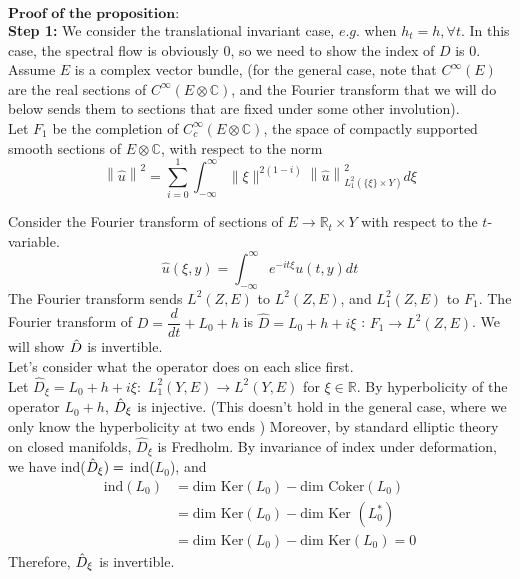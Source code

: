 		\vspace{5mm}
		$\textbf{Proof of the proposition:}$ \\
		\vspace{5mm}
		\textbf{Step 1:} We consider the translational invariant case, $e.g.$ when $h_t=h, \forall t$. In this case, the spectral flow is obviously 0, so we need to show the index of $D$ is 0. Assume $E$ is a complex vector bundle, (for the general case, note that $C^{\infty}(E)$ are the real sections of $C^{\infty}(E\otimes\mathbb{C})$, and the Fourier transform that we will do below sends them to sections that are fixed under some other involution). \\
		\vspace{2mm}
		Let $F_1$ be the completion of $C_c^{\infty}(E\otimes\mathbb{C})$, the space of compactly supported smooth sections of $E\otimes\mathbb{C}$, with respect to the norm \[ \left\lVert \hat{u}\right\rVert^2 = \sum^1_{i=0} \int^{\infty}_{-\infty} \|\xi\|^{2(1-i)} \left\lVert \hat{u}\right\rVert^2_{L^2_1(\{\xi\}\times Y)} d\xi  \]
		
		Consider the Fourier transform of sections of $E\rightarrow \mathbb{R}_t\times Y$ with respect to the $t$-variable. \[\hat{u}(\xi,y) =  \int^{\infty}_{-\infty} e^{-it\xi} u(t,y)dt \]
		The Fourier transform sends $L^2(Z,E) $ to $L^2(Z,E)$, and $L^2_1(Z,E)$ to $F_1$. The Fourier transform of $D= \dfrac{d}{dt} + L_0 + h$ is $\hat{D} = L_0 + h + i\xi$ :    $F_1 \rightarrow L^2(Z,E)$.  We will show $\Hat{D}$ is invertible. \\
		\vspace{5mm} Let's consider what the operator does on each slice first. \\
		Let $\hat{D}_{\xi} = L_0 + h +i\xi : $  $L^2_1(Y,E) \rightarrow L^2(Y,E)$ for $\xi \in \mathbb{R}$. By hyperbolicity of the operator $L_0+h$, $\Hat{D}_{\xi}$ is injective. (This doesn't hold in the general case, where we only know the hyperbolicity at two ends ) Moreover, by standard elliptic theory on closed manifolds, $\hat{D}_{\xi}$ is Fredholm. By invariance of index under deformation, we have ind($\Hat{D}_{\xi}) = $ ind($L_0$), and \begin{align*}
		    \text{ind}(L_0) & = \text{dim Ker}(L_0) - \text{dim Coker}(L_0)  \\
		                    & = \text{dim Ker}(L_0) - \text{dim Ker }(L_0^*)\\
		                    & = \text{dim Ker}(L_0) - \text{dim Ker}(L_0) =0
		\end{align*}
		Therefore, $\Hat{D}_{\xi}$ is invertible. \\
		
